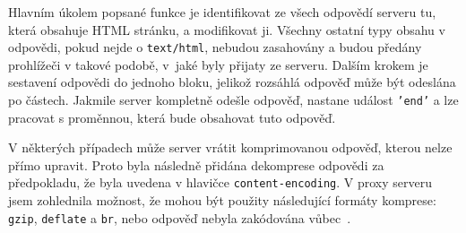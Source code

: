 Hlavním úkolem popsané funkce je identifikovat ze všech odpovědí serveru tu, která obsahuje HTML stránku, a modifikovat ji. Všechny ostatní typy obsahu v odpovědi, pokud nejde o \texttt{text/html}, nebudou zasahovány a budou předány prohlížeči v takové podobě, v~jaké byly přijaty ze serveru. Dalším krokem je sestavení odpovědi do jednoho bloku, jelikož rozsáhlá odpověď může být odeslána po částech. Jakmile server kompletně odešle odpověď, nastane událost \texttt{'end'} a lze pracovat s proměnnou, která bude obsahovat tuto odpověď.

V některých případech může server vrátit komprimovanou odpověď, kterou nelze přímo upravit. Proto byla následně přidána dekomprese odpovědi za předpokladu, že byla uvedena v hlavičce \texttt{content-encoding}. V proxy serveru jsem zohlednila možnost, že mohou být použity následující formáty komprese: \texttt{gzip}, \texttt{deflate} a \texttt{br}, nebo odpověď nebyla zakódována vůbec~\cite{encoding}.

